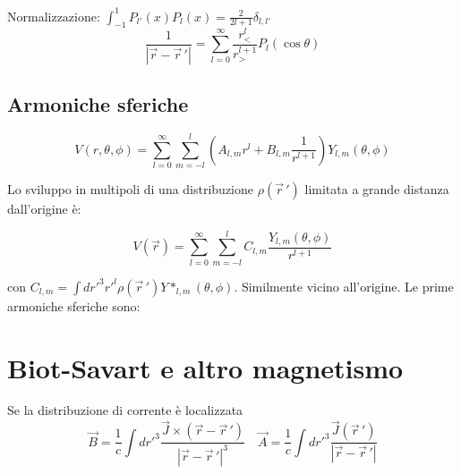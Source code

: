 \documentclass[a4paper, 11pt]{article}
\begin{document}
	Normalizzazione: $\int_{-1}^1 P_{l'}\left( x \right) P_l\left( x \right) = \frac{2}{2l+1}\delta _{l, l'}$
	$$\frac{1}{|\vec{r} - \vec{r}\,'|} = \sum_{l=0}^{\infty} \frac{r _< ^l}{r _> ^{l+1}} P_l \left( \cos\theta \right) $$


	\subsection{Armoniche sferiche}
	$$V\left( r, \theta, \phi \right) = \sum_{l=0}^{\infty} \sum_{m=-l}^{l} \left( A_{l,m} r^l + B_{l,m} \frac{1}{r^{l+1}} \right) Y_{l,m}\left( \theta, \phi \right) $$

	Lo sviluppo in multipoli di una distribuzione $\rho\left( \vec{r}\,' \right) $ limitata 
	a grande distanza dall'origine è:

	$$V\left( \vec{r} \right) = \sum_{l=0}^{\infty} \sum_{m=-l}^{l} C_{l,m} \frac{Y_{l,m}\left( \theta, \phi \right) }{r^{l+1}}$$

	con $C_{l,m} = \int dr'^3 r'^l \rho\left( \vec{r}\,' \right) Y*_{l,m}\left( \theta, \phi \right) $. 
	Similmente vicino all'origine.
	Le prime armoniche sferiche sono:
	\begin{table}[h!]
	\end{table}

	\section{Biot-Savart e altro magnetismo}
	\label{bs}
	Se la distribuzione di corrente è localizzata
	$$\vec{B} = \frac{1}{c}\int dr'^3 \frac{\vec{J}\times\left( \vec{r} - \vec{r}\,' \right) }{|\vec{r}-\vec{r}\,'|^3} \quad \vec{A}=\frac{1}{c}\int dr'^3 \frac{\vec{J}\left( \vec{r}\,' \right) }{|\vec{r}-\vec{r}\,'|}$$
\end{document}
